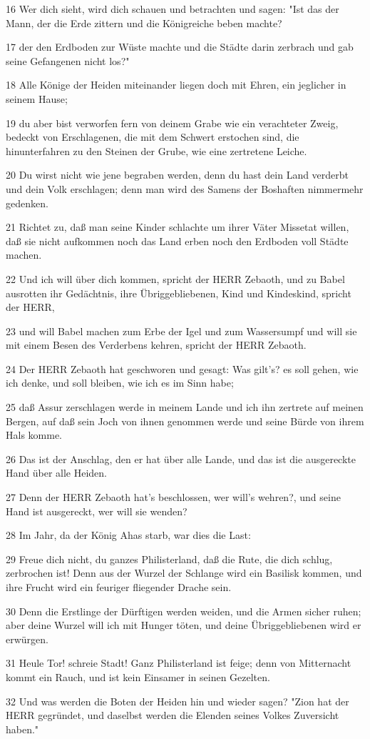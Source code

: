 \par 16 Wer dich sieht, wird dich schauen und betrachten und sagen: "Ist das der Mann, der die Erde zittern und die Königreiche beben machte?
\par 17 der den Erdboden zur Wüste machte und die Städte darin zerbrach und gab seine Gefangenen nicht los?"
\par 18 Alle Könige der Heiden miteinander liegen doch mit Ehren, ein jeglicher in seinem Hause;
\par 19 du aber bist verworfen fern von deinem Grabe wie ein verachteter Zweig, bedeckt von Erschlagenen, die mit dem Schwert erstochen sind, die hinunterfahren zu den Steinen der Grube, wie eine zertretene Leiche.
\par 20 Du wirst nicht wie jene begraben werden, denn du hast dein Land verderbt und dein Volk erschlagen; denn man wird des Samens der Boshaften nimmermehr gedenken.
\par 21 Richtet zu, daß man seine Kinder schlachte um ihrer Väter Missetat willen, daß sie nicht aufkommen noch das Land erben noch den Erdboden voll Städte machen.
\par 22 Und ich will über dich kommen, spricht der HERR Zebaoth, und zu Babel ausrotten ihr Gedächtnis, ihre Übriggebliebenen, Kind und Kindeskind, spricht der HERR,
\par 23 und will Babel machen zum Erbe der Igel und zum Wassersumpf und will sie mit einem Besen des Verderbens kehren, spricht der HERR Zebaoth.
\par 24 Der HERR Zebaoth hat geschworen und gesagt: Was gilt's? es soll gehen, wie ich denke, und soll bleiben, wie ich es im Sinn habe;
\par 25 daß Assur zerschlagen werde in meinem Lande und ich ihn zertrete auf meinen Bergen, auf daß sein Joch von ihnen genommen werde und seine Bürde von ihrem Hals komme.
\par 26 Das ist der Anschlag, den er hat über alle Lande, und das ist die ausgereckte Hand über alle Heiden.
\par 27 Denn der HERR Zebaoth hat's beschlossen, wer will's wehren?, und seine Hand ist ausgereckt, wer will sie wenden?
\par 28 Im Jahr, da der König Ahas starb, war dies die Last:
\par 29 Freue dich nicht, du ganzes Philisterland, daß die Rute, die dich schlug, zerbrochen ist! Denn aus der Wurzel der Schlange wird ein Basilisk kommen, und ihre Frucht wird ein feuriger fliegender Drache sein.
\par 30 Denn die Erstlinge der Dürftigen werden weiden, und die Armen sicher ruhen; aber deine Wurzel will ich mit Hunger töten, und deine Übriggebliebenen wird er erwürgen.
\par 31 Heule Tor! schreie Stadt! Ganz Philisterland ist feige; denn von Mitternacht kommt ein Rauch, und ist kein Einsamer in seinen Gezelten.
\par 32 Und was werden die Boten der Heiden hin und wieder sagen? "Zion hat der HERR gegründet, und daselbst werden die Elenden seines Volkes Zuversicht haben."

